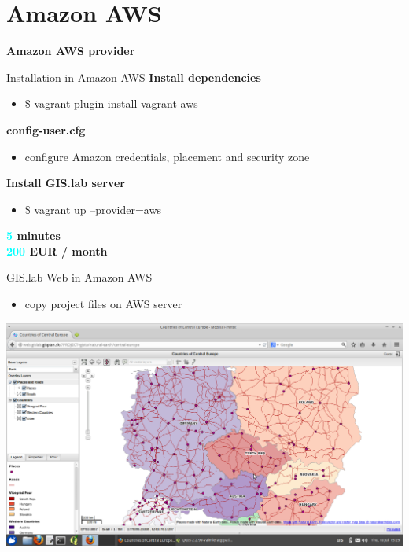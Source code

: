 \documentclass[12pt]{beamer}
\begin{document}
\section{Amazon AWS}
\begin{frame}
	\begin{center}
		\LARGE\textbf{Amazon AWS provider}
	\end{center}
\end{frame}


\begin{frame}{Installation in Amazon AWS}
	\textbf{Install dependencies}
	\begin{itemize}
		\item \$ vagrant plugin install vagrant-aws
	\end{itemize}

	\textbf{config-user.cfg}
	\begin{itemize}
		\item configure Amazon credentials, placement and security zone
	\end{itemize}

	\textbf{Install GIS.lab server}
	\begin{itemize}
		\item \$ vagrant up --provider=aws
	\end{itemize}
	
	\begin{flushleft}
		\textbf{\textcolor{Cyan}{5} minutes} \\
		\textbf{\textcolor{Cyan}{200} EUR / month} \\
	\end{flushleft}
\end{frame}


\begin{frame}{GIS.lab Web in Amazon AWS}
	\begin{itemize}
		\item copy project files on AWS server
	\end{itemize}
	\begin{center}
		\includegraphics[keepaspectratio=true,height=0.7\textheight]{images/rapid-gis-deployment/project-gislab-web-amazon-aws.png}
	\end{center}
\end{frame}
\end{document}
